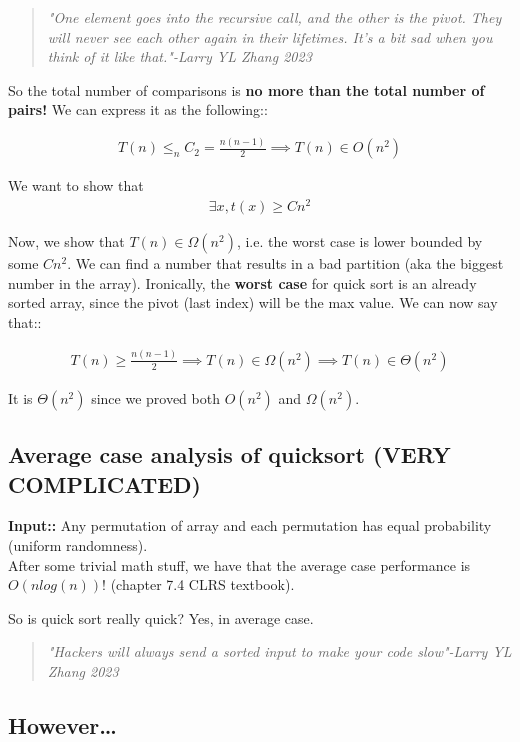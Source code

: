 \documentclass[12pt]{article}
\begin{document}
\begin{quote}
    \textit{"One element goes into the recursive call, and the other is the pivot. They will never see each other again in their lifetimes. It's a bit sad when you think of it like that."-Larry YL Zhang 2023}
\end{quote}

So the total number of comparisons is \textbf{no more than the total number of pairs!} We can express it as the following::

\begin{align*}
    T(n)\leq _nC_2=\frac{n(n-1)}{2}\implies T(n)\in O(n^2)
\end{align*}

We want to show that
\begin{align*}
    \exists x, t(x)\geq Cn^2
\end{align*}

Now, we show that $T(n)\in \Omega(n^2)$, i.e. the worst case is lower bounded by some $Cn^2$. We can find a number that results in a bad partition (aka the biggest number in the array). Ironically, the \textbf{worst case} for quick sort is an already sorted array, since the pivot (last index) will be the max value. We can now say that::

\begin{align*}
    T(n)\geq \frac{n(n-1)}{2}\implies T(n)\in \Omega(n^2)\implies T(n)\in \Theta(n^2)
\end{align*}

It is $\Theta(n^2)$ since we proved both $O(n^2)$ and $\Omega(n^2)$.

\subsection*{Average case analysis of quicksort (VERY COMPLICATED)}

\textbf{Input::} Any permutation of array and each permutation has equal probability (uniform randomness).\\ After some trivial math stuff, we have that the average case performance is $O(nlog(n))$! (chapter 7.4 CLRS textbook).

So is quick sort really quick? Yes, in average case.

\begin{quote}
    \textit{"Hackers will always send a sorted input to make your code slow"-Larry YL Zhang 2023}
\end{quote}

\subsection*{However\ldots}
\end{document}
